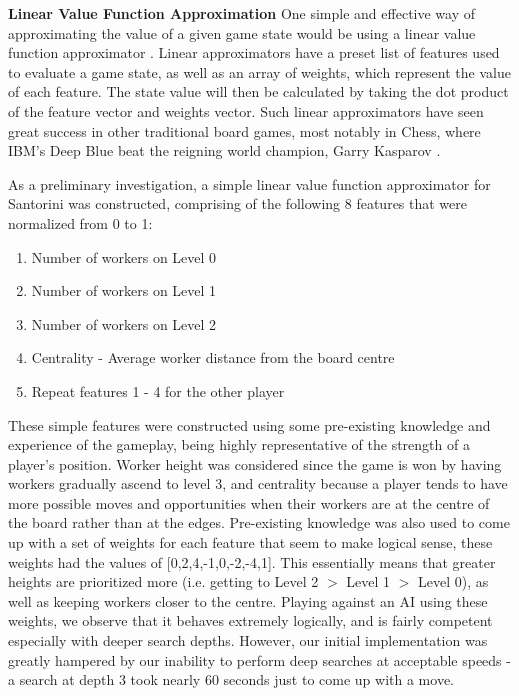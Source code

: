\documentclass[a4paper,12pt,table]{article}
\begin{document}
\textbf{Linear Value Function Approximation}
\newline
One simple and effective way of approximating the value of a given game state would be using a linear value function approximator \cite{Reinforcement learning: An introduction}. Linear approximators have a preset list of features used to evaluate a game state, as well as an array of weights, which represent the value of each feature. The state value will then be calculated by taking the dot product of the feature vector and weights vector. Such linear approximators have seen great success in other traditional board games, most notably in Chess, where IBM’s Deep Blue beat the reigning world champion, Garry Kasparov \cite{Deep Blue}. \par

As a preliminary investigation, a simple linear value function approximator for Santorini was constructed, comprising of the following 8 features that were normalized from 0 to 1:
\begin{enumerate}
    \item Number of workers on Level 0
    \item Number of workers on Level 1
    \item Number of workers on Level 2
    \item Centrality - Average worker distance from the board centre
    \item Repeat features 1 - 4 for the other player
\end{enumerate}

These simple features were constructed using some pre-existing knowledge and experience of the gameplay, being highly representative of the strength of a player’s position. Worker height was considered since the game is won by having workers gradually ascend to level 3, and centrality because a player tends to have more possible moves and opportunities when their workers are at the centre of the board rather than at the edges. Pre-existing knowledge was also used to come up with a set of weights for each feature that seem to make logical sense, these weights had the values of [0,2,4,-1,0,-2,-4,1]. This essentially means that greater heights are prioritized more (i.e. getting to Level 2 $>$ Level 1 $>$ Level 0), as well as keeping workers closer to the centre. Playing against an AI using these weights, we observe that it behaves extremely logically, and is fairly competent especially with deeper search depths. However, our initial implementation was greatly hampered by our inability to perform deep searches at acceptable speeds - a search at depth 3 took nearly 60 seconds just to come up with a move. \par
\end{document}
